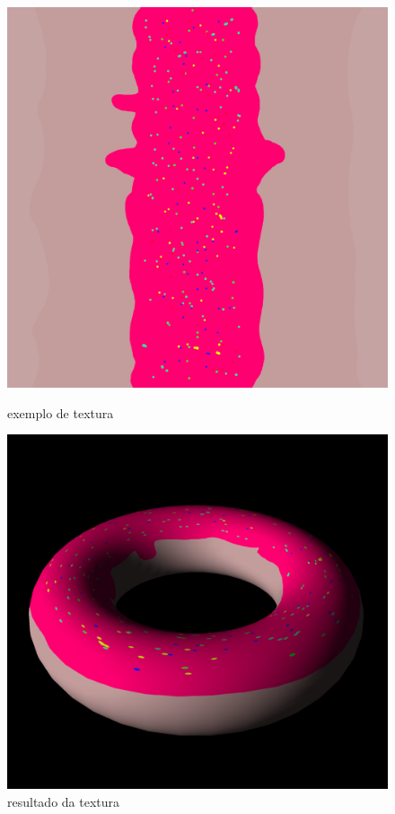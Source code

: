 \documentclass[a4paper]{report}
\begin{document}
\begin{figure}[H]
    \centering
    \begin{minipage}{0.40\textwidth}
        \centering
        \includegraphics[width=\textwidth]{images/donut.jpg}
        \caption{exemplo de textura}
    \end{minipage}\hfill
    \begin{minipage}{0.59\textwidth}
        \centering
        \includegraphics[width=\textwidth]{images/donut_rendered.png}
        \caption{resultado da textura}
    \end{minipage}\hfill
\end{figure}
\end{document}
